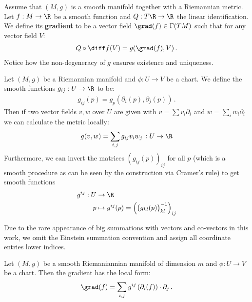 \begin{definition}
	Assume that $(M,g)$ is a smooth manifold together with a Riemannian metric. Let $f:M\to \R$ be a smooth function and $Q: T\R\to \R$ the linear identification. We define its \textbf{gradient} to be a vector field $\grad(f)\in \Gamma(TM)$ such that for any vector field $V$:
	\begin{align*}
		 Q\circ \diff f (V) = g(\grad(f),V) \, .
	\end{align*} Notice how the non-degeneracy of $g$ ensures existence and uniqueness. 
\end{definition}
\begin{definition}\label{def:vb-localDescriptionOfGradientGij}
	Let $(M,g)$ be a Riemannian manifold and $\phi:U\to V$ be a chart. We define the smooth functions $g_{ij}:U\to \R$ to be:
	\begin{align*}
		g_{ij}(p)=g_p(\partial_i(p),\partial_j(p)) \, .
	\end{align*}
	Then if two vector fields $v,w$ over $U$ are given with $v=\sum v_i \partial_i$ and $w=\sum _i w_i \partial_i$ we can calculate the metric locally:
	\begin{align*}
		g(v,w)=\sum_{i,j}g_{ij} v_iw_j\, :U\to \R
	\end{align*} Furthermore, we can invert the matrices $(g_{ij}(p))_{ij}$ for all $p$ (which is a smooth procedure as can be seen by the construction via Cramer's rule) to get smooth functions 
	\begin{align*}
		g^{ij}: U&\to \R\\
		p&\mapsto g^{ij}(p)= \left( \big(g_{kl}(p)\big)_{kl}^{-1} \right)_{ij}
	\end{align*}
\end{definition}
\begin{remark}
	Due to the rare appearance of big summations with vectors and co-vectors in this work, we omit the Einstein summation convention and assign all coordinate entries lower indices. 
\end{remark}



\begin{lemma}\label{lem:vb-localDescriptionOfGradient}
	Let $(M,g)$ be a smooth Riemaniannian manifold of dimension $m$ and $\phi:U\to V$ be a chart. Then the gradient has the local form:
	\begin{align*}
		\grad(f) =\sum_{i,j}g^{ij}  \left(\partial_i (f) \right)\cdot  \partial_j \, .
	\end{align*}
\end{lemma}

